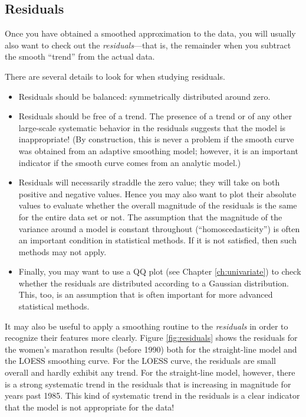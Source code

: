 \subsection{Residuals}


Once you have obtained a smoothed approximation to the data, you will
usually also want to check out the \emph{residuals}---that is, the
remainder when you subtract the smooth ``trend'' from the actual data.

There are several details to look for when studying residuals.

\begin{itemize}
\item Residuals should be balanced: symmetrically distributed around
  zero.
\item Residuals should be free of a trend. The presence of a trend or
  of any other large-scale systematic behavior in the residuals
  suggests that the model is inappropriate! (By construction, this is
  never a problem if the smooth curve was obtained from an adaptive
  smoothing model; however, it is an important indicator if the smooth
  curve comes from an analytic model.)
\item Residuals will necessarily straddle the zero value; they will
  take on both positive and negative values. Hence you may also want
  to plot their absolute values to evaluate whether the overall
  magnitude of the residuals is the same for the entire data set or
  not. The assumption that the magnitude of the variance around a
  model is constant throughout (``homoscedasticity'')  is often an
  important condition in statistical methods. If it is not satisfied,
  then such methods may not apply.
\item Finally, you may want to use a QQ plot  (see Chapter
  \ref{ch:univariate}) to check whether the residuals are distributed
  according to a Gaussian distribution. This, too, is an assumption
  that is often important for more advanced statistical methods.
\end{itemize}

It may also be useful to apply a smoothing routine to the
\emph{residuals} in order to recognize their features more clearly.
Figure \ref{fig:residuals} shows the residuals for the women's
marathon results (before 1990) both for the straight-line model and
the LOESS smoothing curve. For the LOESS curve, the residuals are
small overall and hardly exhibit any trend. For the straight-line
model, however, there is a strong systematic trend in the residuals
that is increasing in magnitude for years past 1985. This kind of
systematic trend in the residuals is a clear indicator that the model
is not appropriate for the data!

